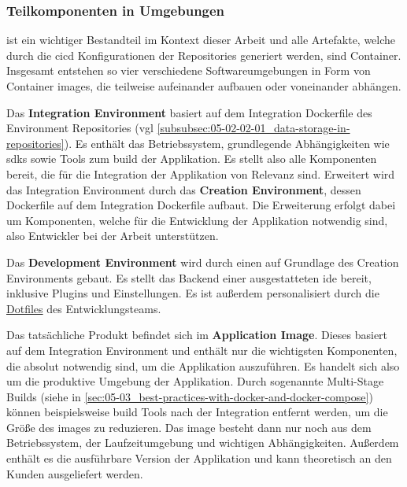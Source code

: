 \subsubsection{Teilkomponenten in Umgebungen}
\label{subsubsec:05-02-02-02_sub-components-in-environments}

 ist ein wichtiger Bestandteil im Kontext dieser Arbeit und alle Artefakte, welche durch die \Gls{cicd} Konfigurationen der Repositories generiert werden, sind Container. Insgesamt entstehen so vier verschiedene Softwareumgebungen in Form von Container \Glspl{image}, die teilweise aufeinander aufbauen oder voneinander abhängen.

Das \textbf{Integration Environment} basiert auf dem Integration Dockerfile des Environment Repositories (\acrshort{vgl} \autoref{subsubsec:05-02-02-01_data-storage-in-repositories}). Es enthält das Betriebssystem, grundlegende Abhängigkeiten wie \Glspl{sdk} sowie Tools zum \Gls{build} der Applikation. Es stellt also alle Komponenten bereit, die für die Integration der Applikation von Relevanz sind. Erweitert wird das Integration Environment durch das \textbf{Creation Environment}, dessen Dockerfile auf dem Integration Dockerfile aufbaut. Die Erweiterung erfolgt dabei um Komponenten, welche für die Entwicklung der Applikation notwendig sind, also Entwickler bei der Arbeit unterstützen.

Das \textbf{Development Environment} wird durch einen  auf Grundlage des Creation Environments gebaut. Es stellt das Backend einer ausgestatteten \Gls{ide} bereit, inklusive Plugins und Einstellungen. Es ist außerdem personalisiert durch die \hyperref[sec:03-04_dotfiles]{Dotfiles} des Entwicklungsteams.

Das tatsächliche Produkt befindet sich im \textbf{Application Image}. Dieses basiert auf dem Integration Environment und enthält nur die wichtigsten Komponenten, die absolut notwendig sind, um die Applikation auszuführen. Es handelt sich also um die produktive Umgebung der Applikation. Durch sogenannte Multi-Stage Builds (siehe  in \autoref{sec:05-03_best-practices-with-docker-and-docker-compose}) können beispielsweise \Gls{build} Tools nach der Integration entfernt werden, um die Größe des \Glspl{image} zu reduzieren. Das \Gls{image} besteht dann nur noch aus dem Betriebssystem, der Laufzeitumgebung und wichtigen Abhängigkeiten. Außerdem enthält es die ausführbare Version der Applikation und kann theoretisch an den Kunden ausgeliefert werden.

